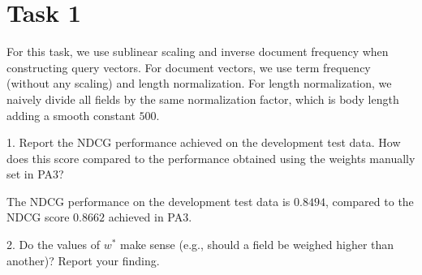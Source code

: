 
\usepackage{graphicx,amssymb,amsmath,enumerate}
\usepackage{courier}
\usepackage{color}
\usepackage{listings}
\usepackage{fancyvrb}
\usepackage{stmaryrd}

\oddsidemargin 0in
\evensidemargin 0in
\textwidth 6.5in
\topmargin -0.5in
\textheight 9.0in




\pagestyle{myheadings}  %

\section{Task 1}
For this task, we use sublinear scaling and inverse document frequency when constructing query vectors.
For document vectors, we use term frequency (without any scaling) and length normalization.
For length normalization, we naively divide all fields by the same normalization factor, which is
body length adding a smooth constant $500$.

1. Report the NDCG performance achieved on the development test data. How does this score compared to the performance obtained using the weights manually set in PA3?

The NDCG performance on the development test data is $0.8494$, compared to the NDCG score $0.8662$ achieved in PA3. 

2. Do the values of $w^*$ make sense (e.g., should a field be weighed higher than another)? Report your finding.

